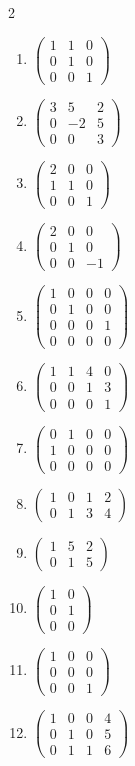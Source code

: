 \documentclass[12pt]{article}
\begin{document}
\begin{multicols}{2}
\begin{enumerate}[label=\textbf{\arabic*.},start=28,leftmargin=*]
\item $\begin{pmatrix}1&1&0\\0&1&0\\0&0&1\end{pmatrix}$
\item $\begin{pmatrix}3&5&2\\0&-2&5\\0&0&3\end{pmatrix}$
\item $\begin{pmatrix}2&0&0\\1&1&0\\0&0&1\end{pmatrix}$
\item $\begin{pmatrix}2&0&0\\0&1&0\\0&0&-1\end{pmatrix}$
\item $\begin{pmatrix}1&0&0&0\\0&1&0&0\\0&0&0&1\\0&0&0&0\end{pmatrix}$
\item $\begin{pmatrix}1&1&4&0\\0&0&1&3\\0&0&0&1\end{pmatrix}$
\item $\begin{pmatrix}0&1&0&0\\1&0&0&0\\0&0&0&0\end{pmatrix}$
\item $\begin{pmatrix}1&0&1&2\\0&1&3&4\end{pmatrix}$
\item $\begin{pmatrix}1&5&2\\0&1&5\end{pmatrix}$
\item $\begin{pmatrix}1&0\\0&1\\0&0\end{pmatrix}$
\item $\begin{pmatrix}1&0&0\\0&0&0\\0&0&1\end{pmatrix}$
\item $\begin{pmatrix}1&0&0&4\\0&1&0&5\\0&1&1&6\end{pmatrix}$
\end{enumerate}
\end{multicols}
\end{document}
